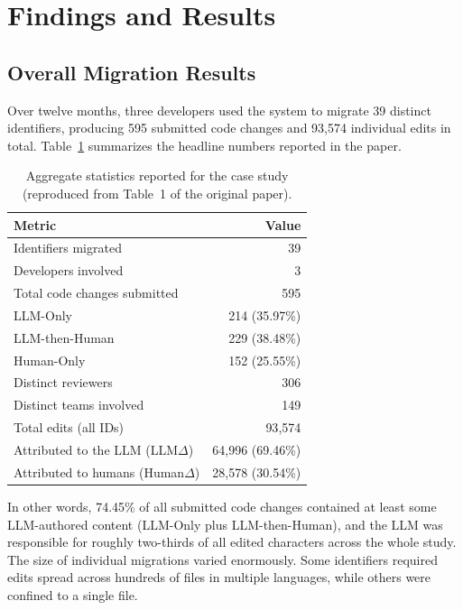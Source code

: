 \section{Findings and Results}

\subsection{Overall Migration Results}
Over twelve months, three developers used the system to migrate 39
distinct identifiers, producing 595 submitted code changes and
93{,}574 individual edits in total. Table~\ref{tab:aggregate}
summarizes the headline numbers reported in the paper.

\begin{table}[t]
\caption{Aggregate statistics reported for the case study (reproduced from Table~1 of the original paper).}
\label{tab:aggregate}
\begin{tabular}{@{}lr@{}}
\toprule
Metric & Value \\
\midrule
Identifiers migrated & 39 \\
Developers involved & 3 \\
Total code changes submitted & 595 \\
\quad LLM-Only & 214 (35.97\%) \\
\quad LLM-then-Human & 229 (38.48\%) \\
\quad Human-Only & 152 (25.55\%) \\
Distinct reviewers & 306 \\
Distinct teams involved & 149 \\
Total edits (all IDs) & 93{,}574 \\
\quad Attributed to the LLM (LLM$\Delta$) & 64{,}996 (69.46\%) \\
\quad Attributed to humans (Human$\Delta$) & 28{,}578 (30.54\%) \\
\bottomrule
\end{tabular}
\end{table}

In other words, 74.45\% of all submitted code changes contained at
least some LLM-authored content (LLM-Only plus LLM-then-Human), and
the LLM was responsible for roughly two-thirds of all edited
characters across the whole study. The size of individual migrations
varied enormously. Some identifiers required edits spread across
hundreds of files in multiple languages, while others were confined
to a single file.

